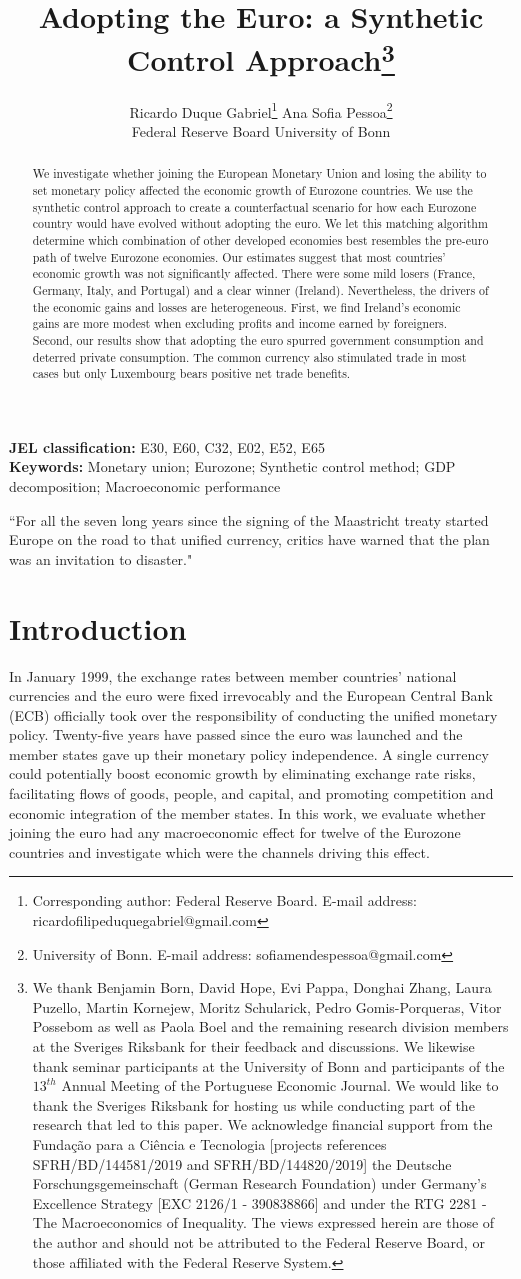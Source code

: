 \documentclass[12pt]{article}
\title{Adopting the Euro: a Synthetic Control Approach\footnote{We thank Benjamin Born, David Hope, Evi Pappa, Donghai Zhang, Laura Puzello, Martin Kornejew, Moritz Schularick, Pedro Gomis-Porqueras, Vitor Possebom as well as Paola Boel and the remaining research division members at the Sveriges Riksbank for their feedback and discussions. We likewise thank seminar participants at the University of Bonn and participants of the $13^{th}$ Annual Meeting of the Portuguese Economic Journal. We would like to thank the Sveriges Riksbank for hosting us while conducting part of the research that led to this paper. We acknowledge financial support from the Fundação para a Ciência e Tecnologia [projects references SFRH/BD/144581/2019 and SFRH/BD/144820/2019] the Deutsche Forschungsgemeinschaft (German Research Foundation) under Germany's Excellence Strategy [EXC 2126/1 - 390838866] and under the RTG 2281 - The Macroeconomics of Inequality. The views expressed herein are those of the author and should not be attributed to the Federal Reserve Board, or those affiliated with the Federal Reserve System.}}
\author{\hspace{-2em} Ricardo Duque Gabriel\footnote{Corresponding author: Federal Reserve Board. E-mail address: ricardofilipeduquegabriel@gmail.com} \hspace{5em} Ana Sofia Pessoa\footnote{University of Bonn. E-mail address: sofiamendespessoa@gmail.com}\\ \hspace{-1em} Federal Reserve Board \hspace{5em} University of Bonn}
\begin{document}
\begin{titlepage}
\clearpage\thispagestyle{empty}
\maketitle
\thispagestyle{empty}
\vspace{-3em}
\begin{abstract}
We investigate whether joining the European Monetary Union and losing the ability to set monetary policy affected the economic growth of Eurozone countries. We use the synthetic control approach to create a counterfactual scenario for how each Eurozone country would have evolved without adopting the euro. We let this matching algorithm determine which combination of other developed economies best resembles the pre-euro path of twelve Eurozone economies. Our estimates suggest that most countries' economic growth was not significantly affected. There were some mild losers (France, Germany, Italy, and Portugal) and a clear winner (Ireland). Nevertheless, the drivers of the economic gains and losses are heterogeneous. First, we find Ireland's economic gains are more modest when excluding profits and income earned by foreigners. Second, our results show that adopting the euro spurred government consumption and deterred private consumption. The common currency also stimulated trade in most cases but only Luxembourg bears positive net trade benefits.
\end{abstract}

\vspace{1ex}
\textbf{JEL classification:} E30, E60, C32, E02, E52, E65 \\

\textbf{Keywords:}  Monetary union; Eurozone; Synthetic control method; GDP decomposition; Macroeconomic performance

\end{titlepage}

\clearpage

\indent ``For all the seven long years since the signing of the Maastricht treaty started Europe on the road to that unified currency, critics have warned that the plan was an invitation to disaster." \cite{Krugman1998}

\section{Introduction}

In January 1999, the exchange rates between member countries’ national currencies and the euro were fixed irrevocably and the European Central Bank (ECB) officially took over the responsibility of conducting the unified monetary policy. Twenty-five years have passed since the euro was launched and the member states gave up their monetary policy independence. A single currency could potentially boost economic growth by eliminating exchange rate risks, facilitating flows of goods, people, and capital, and promoting competition and economic integration of the member states. In this work, we evaluate whether joining the euro had any macroeconomic effect for twelve of the Eurozone countries and investigate which were the channels driving this effect.
\end{document}
